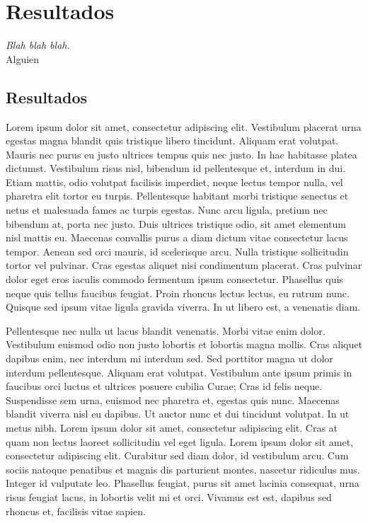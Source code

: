
\chapter*{Resultados} \label{cap6}


\begin{flushright}
\begin{minipage}{7.85cm}
    {\em Blah blah blah.} \\  Alguien
\end{minipage}
\end{flushright}

\vspace*{5mm}

\section*{Resultados}

Lorem ipsum dolor sit amet, consectetur adipiscing elit. Vestibulum placerat
urna egestas magna blandit quis tristique libero tincidunt. Aliquam erat
volutpat. Mauris nec purus eu justo ultrices tempus quis nec justo. In hac
habitasse platea dictumst. Vestibulum risus nisl, bibendum id pellentesque et,
interdum in dui. Etiam mattis, odio volutpat facilisis imperdiet, neque lectus
tempor nulla, vel pharetra elit tortor eu turpis. Pellentesque habitant morbi
tristique senectus et netus et malesuada fames ac turpis egestas. Nunc arcu
ligula, pretium nec bibendum at, porta nec justo. Duis ultrices tristique odio,
sit amet elementum nisl mattis eu. Maecenas convallis purus a diam dictum vitae
consectetur lacus tempor. Aenean sed orci mauris, id scelerisque arcu. Nulla
tristique sollicitudin tortor vel pulvinar. Cras egestas aliquet nisi
condimentum placerat. Cras pulvinar dolor eget eros iaculis commodo fermentum
ipsum consectetur. Phasellus quis neque quis tellus faucibus feugiat. Proin
rhoncus lectus lectus, eu rutrum nunc. Quisque sed ipsum vitae ligula gravida
viverra. In ut libero est, a venenatis diam.

Pellentesque nec nulla ut lacus blandit venenatis. Morbi vitae enim dolor.
Vestibulum euismod odio non justo lobortis et lobortis magna mollis. Cras
aliquet dapibus enim, nec interdum mi interdum sed. Sed porttitor magna ut dolor
interdum pellentesque. Aliquam erat volutpat. Vestibulum ante ipsum primis in
faucibus orci luctus et ultrices posuere cubilia Curae; Cras id felis neque.
Suspendisse sem urna, euismod nec pharetra et, egestas quis nunc. Maecenas
blandit viverra nisl eu dapibus. Ut auctor nunc et dui tincidunt volutpat. In ut
metus nibh. Lorem ipsum dolor sit amet, consectetur adipiscing elit. Cras at
quam non lectus laoreet sollicitudin vel eget ligula. Lorem ipsum dolor sit
amet, consectetur adipiscing elit. Curabitur sed diam dolor, id vestibulum arcu.
Cum sociis natoque penatibus et magnis dis parturient montes, nascetur ridiculus
mus. Integer id vulputate leo. Phasellus feugiat, purus sit amet lacinia
consequat, urna risus feugiat lacus, in lobortis velit mi et orci. Vivamus est
est, dapibus sed rhoncus et, facilisis vitae sapien.


